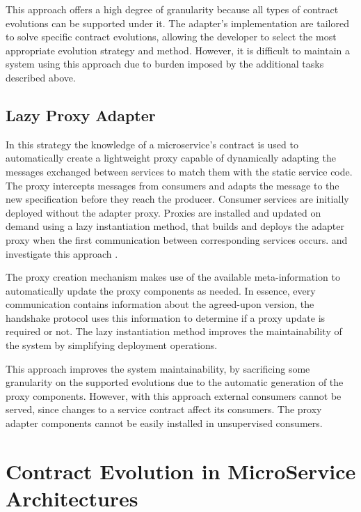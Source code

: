 This approach offers a high degree of granularity because all types of contract evolutions can be supported under it.
The adapter's implementation are tailored to solve specific contract evolutions, allowing the developer to select the most appropriate evolution strategy and method.
However, it is difficult to maintain a system using this approach due to burden imposed by the additional tasks described above.

\subsection{Lazy Proxy Adapter} %
\label{sec:proxy_adapter}

In this strategy the knowledge of a microservice’s
contract is used to automatically create a lightweight proxy capable of dynamically adapting the messages exchanged between services to match them with the static service code.
The proxy intercepts messages from consumers and adapts the message to the new specification before they reach the producer.
Consumer services are initially deployed without the adapter proxy.
Proxies are installed and updated on demand using a lazy instantiation method, that builds and deploys the adapter proxy when the first communication between corresponding services occurs.
\citeauthor{seco2020robust} and \citeauthor{santosregent} investigate this approach \cite{seco2020robust, santosregent}.

The proxy creation mechanism makes use of the available meta-information
to automatically update the proxy components as needed.
In essence, every communication contains information about the agreed-upon version, the handshake protocol uses this information to determine if a proxy update is required or not.
The lazy instantiation method improves the maintainability of the system by
simplifying deployment operations.

This approach improves the system maintainability, by sacrificing some granularity on the supported evolutions due to the automatic generation of the proxy components.
However, with this approach external consumers cannot be served, since changes to a service contract affect its consumers.
The proxy adapter components cannot be easily installed in unsupervised consumers.

\section{Contract Evolution in MicroService Architectures} %
\label{sec:contract_evolution_in_microservice_architectures}

